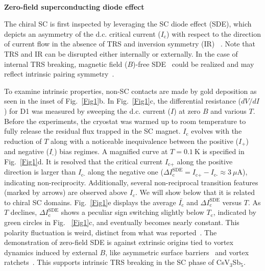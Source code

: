 \documentclass[article,reprint,amsmath,amssymb,superscriptaddress,longbibliography]{revtex4-1}
\begin{document}
~\\
\noindent\textbf{Zero-field superconducting diode effect}

\noindent
The chiral SC is first inspected by leveraging the SC diode effect (SDE), which
depicts an asymmetry of the d.c. critical current ($I_\textrm{c}$) with respect to  the direction of current flow in the absence of TRS and inversion symmetry (IR) ~\cite{Ono2020Nature,Parkin2022NP,JiangK2022PRX}. 
Note that TRS and IR can be disrupted either internally or externally. 
In the case of internal TRS breaking, magnetic field ($B$)-free SDE~\cite{Ali2022Nature,Parkin2022NM,Li2022NP} could be realized and 
may reflect intrinsic pairing symmetry~\cite{Li2022NP}. 

To examine intrinsic properties, non-SC contacts are made by gold deposition as seen in the inset of Fig.~\ref{Fig1}b. In Fig.~\ref{Fig1}c, the differential resistance ($dV/dI$) for D1 was 
measured by sweeping the d.c. current ($I$) at zero $B$ and various $T$. Before the experiments, the cryostat was warmed up to room temperature to fully release the residual flux trapped in the SC magnet. $I_\textrm{c}$ evolves with the reduction of $T$ along with a noticeable 
inequivalence between the positive ($I_\textrm{+}$) and negative ($I_\textrm{-}$) bias regimes. 
A magnified curve at $T=0.1~$K is specified in Fig.~\ref{Fig1}d.
It is resolved that the critical current $I_\textrm{c+}$
along the positive direction is larger than $I_\textrm{c-}$ 
along the negative one 
($\Delta I^\textrm{SDE}_\textrm{c}=I_\textrm{c+}-I_\textrm{c-}\approx3~\mu$A), indicating non-reciprocity. Additionally, several non-reciprocal transition features (marked by arrows) are observed above $I_\textrm{c}$. We will show below that it is related to chiral SC domains. 
Fig.~\ref{Fig1}e displays the average $\bar{I_\textrm{c}}$ and $\Delta I^\textrm{SDE}_\textrm{c}$ versus $T$. As $T$ declines, $\Delta I^\textrm{SDE}_\textrm{c}$ shows a peculiar sign switching slightly below $T_\textrm{c}$, indicated by green circles in Fig. ~\ref{Fig1}c, and eventually becomes nearly constant. This polarity fluctuation is weird, distinct from what was reported~\cite{Parkin2022NP,Parkin2022NM}. The demonstration of zero-field SDE is against extrinsic origins tied to vortex dynamics induced by external $B$, like asymmetric surface barriers~\cite{Suri2022APL} and vortex ratchets~\cite{WangX2022PRB}. This supports intrinsic TRS breaking in the SC phase of CsV$_3$Sb$_5$.
\end{document}

